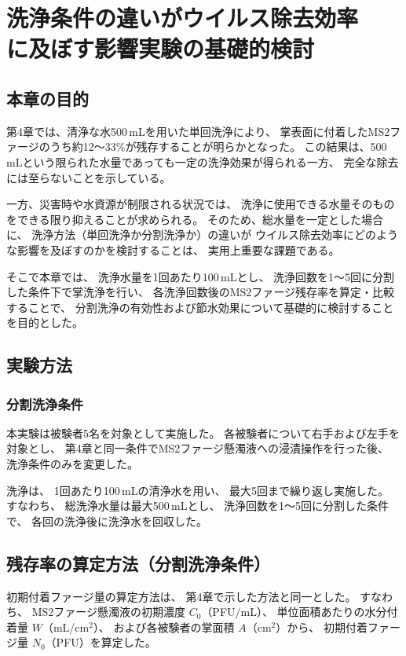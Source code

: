 \chapter[
洗浄条件の違いがウイルス除去効率に及ぼす影響
]{
洗浄条件の違いがウイルス除去効率\\\hspace{4.1em}に及ぼす影響実験の基礎的検討
}

\section{本章の目的}
第4章では、清浄な水500\,mLを用いた単回洗浄により、
掌表面に付着したMS2ファージのうち約12～33\%が残存することが明らかとなった。
この結果は、500\,mLという限られた水量であっても一定の洗浄効果が得られる一方、
完全な除去には至らないことを示している。

一方、災害時や水資源が制限される状況では、
洗浄に使用できる水量そのものをできる限り抑えることが求められる。
そのため、総水量を一定とした場合に、
洗浄方法（単回洗浄か分割洗浄か）の違いが
ウイルス除去効率にどのような影響を及ぼすのかを検討することは、
実用上重要な課題である。

そこで本章では、
洗浄水量を1回あたり100\,mLとし、
洗浄回数を1～5回に分割した条件下で掌洗浄を行い、
各洗浄回数後のMS2ファージ残存率を算定・比較することで、
分割洗浄の有効性および節水効果について基礎的に検討することを目的とした。


\section{実験方法}

\subsection{分割洗浄条件}
本実験は被験者5名を対象として実施した。
各被験者について右手および左手を対象とし、
第4章と同一条件でMS2ファージ懸濁液への浸漬操作を行った後、
洗浄条件のみを変更した。

洗浄は、
1回あたり100\,mLの清浄水を用い、
最大5回まで繰り返し実施した。
すなわち、
総洗浄水量は最大500\,mLとし、
洗浄回数を1～5回に分割した条件で、
各回の洗浄後に洗浄水を回収した。

\newpage
\section{残存率の算定方法（分割洗浄条件）}
初期付着ファージ量の算定方法は、
第4章で示した方法と同一とした。
すなわち、
MS2ファージ懸濁液の初期濃度 $C_0$（PFU/mL）、
単位面積あたりの水分付着量 $W$（mL/cm$^2$）、
および各被験者の掌面積 $A$（cm$^2$）から、
初期付着ファージ量 $N_0$（PFU）を算定した。

